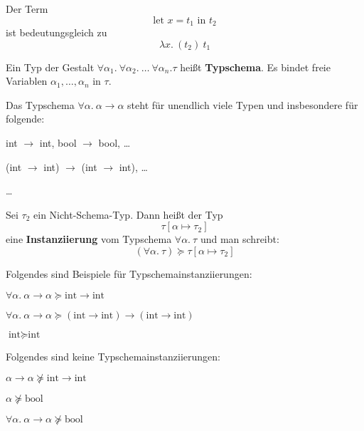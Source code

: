 Der Term
\[\text{let } x = t_1 \text{ in } t_2\]
ist bedeutungsgleich zu
\[\lambda x.\ (t_2)\ t_1\]

\begin{definition}[Typschema]%
    Ein Typ der Gestalt $\forall \alpha_1.\ \forall \alpha_2.\ \dots\ \forall \alpha_n. \tau$
    heißt \textbf{Typschema}. Es bindet freie Variablen $\alpha_1, \dots, \alpha_n$
    in $\tau$.
\end{definition}

\begin{beispiel}[Typschema]
    Das Typschema $\forall \alpha.\ \alpha \rightarrow \alpha$ steht für unendlich
    viele Typen und insbesondere für folgende:
    \begin{bspenum}
        \item int $\rightarrow$ int, bool $\rightarrow$ bool, \dots
        \item (int $\rightarrow$ int) $\rightarrow$ (int $\rightarrow$ int), \dots
        \item \dots
    \end{bspenum}
\end{beispiel}

\begin{definition}[Typschemainstanziierung]%
    Sei $\tau_2$ ein Nicht-Schema-Typ. Dann heißt der Typ
    \[\tau[\alpha \mapsto \tau_2]\]
    eine \textbf{Instanziierung} vom Typschema $\forall \alpha.\ \tau$
    und man schreibt:
    \[(\forall \alpha.\ \tau) \succeq \tau [\alpha \mapsto \tau_2]\]
\end{definition}

\begin{beispiel}[Typschemainstanziierung]
    Folgendes sind Beispiele für Typschemainstanziierungen:
    \begin{bspenum}
        \item $\forall \alpha.\ \alpha \rightarrow \alpha \succeq \text{int} \rightarrow \text{int}$
        \item $\forall \alpha.\ \alpha \rightarrow \alpha \succeq (\text{int} \rightarrow \text{int}) \rightarrow (\text{int} \rightarrow \text{int})$
        \item $\text{int} \succeq \text{int}$
    \end{bspenum}

    Folgendes sind keine Typschemainstanziierungen:
    \begin{bspenum}
        \item $\alpha \rightarrow \alpha \nsucceq \text{int} \rightarrow \text{int}$
        \item $\alpha \nsucceq \text{bool}$
        \item $\forall \alpha.\ \alpha \rightarrow \alpha \nsucceq \text{bool}$
    \end{bspenum}
\end{beispiel}

